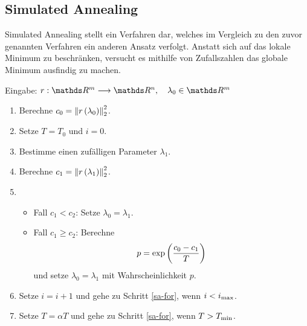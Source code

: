 
		\subsection{Simulated Annealing} %
		\label{sub:simulated_annealing}

			Simulated Annealing stellt ein Verfahren dar, welches im Vergleich zu den zuvor genannten Verfahren ein anderen Ansatz verfolgt.
			Anstatt sich auf das lokale Minimum zu beschränken, versucht es mithilfe von Zufallszahlen das globale Minimum ausfindig zu machen.
			
		
			\begin{tcolorbox}[colframe=black,colbacktitle=white,coltitle=black, attach boxed title to top center={yshift=-2mm},enhanced, titlerule=0.1pt, boxrule=0.5pt, breakable, arc=5pt,title=Algorithmus:\quad Simulated Annealing]
				Eingabe: $r:\SR^m\longrightarrow\SR^n,\quad \lambda_0\in\SR^m$

				\begin{enumerate}[label=\normalfont (\arabic*)]
					\item Berechne $c_0 = \left\|  r\left(  \lambda_0  \right)  \right\|_2^2$.
					\item Setze $T = T_0$ und $i=0$.
					\item \label{sa-for} Bestimme einen zufälligen Parameter $\lambda_1$.
					\item Berechne $c_1 = \left\|  r\left(  \lambda_1  \right)  \right\|_2^2$.
					\item
						\begin{itemize}
							\item Fall $c_1 < c_2$: Setze $\lambda_0 = \lambda_1$.
							\item Fall $c_1 \geq c_2$: Berechne
								\[ p = \exp\left(  \frac{c_0 - c_1}{T}  \right) \]
								und setze $\lambda_0 = \lambda_1$ mit Wahrscheinlichkeit $p$. 
						\end{itemize}
					\item Setze $i=i+1$ und gehe zu Schritt \ref{sa-for}, wenn $i < i_{\mathrm{max}}$.
					\item Setze $T=\alpha T$ und gehe zu Schritt \ref{sa-for}, wenn $T > T_{\mathrm{min}}$.
				\end{enumerate}
			\end{tcolorbox}

			\begin{tcolorbox}[colframe=black,colbacktitle=white,coltitle=black, attach boxed title to top center={yshift=-2mm},enhanced, titlerule=0.1pt, boxrule=0.5pt, breakable, arc=5pt,title=C++-Implementierung:\quad Curve Fitting mit Simulated Annealing]
				
			\end{tcolorbox}

